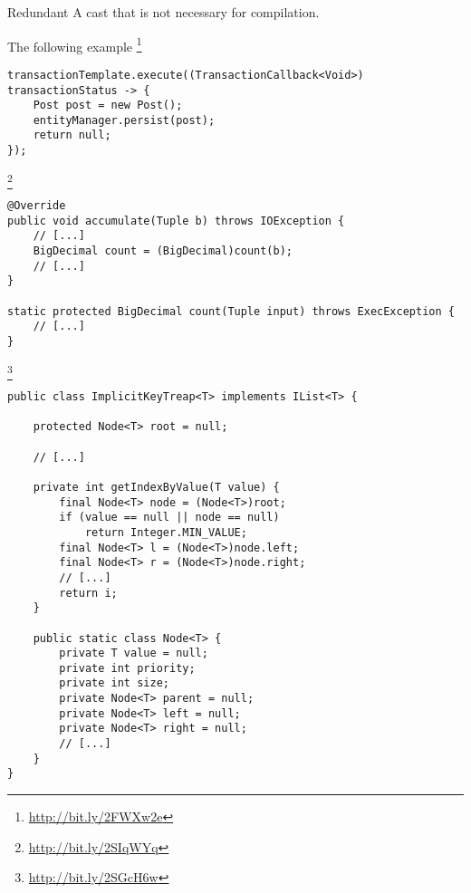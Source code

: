 \begin{pattern}{Redundant}
A cast that is not necessary for compilation.

\instances{}
The following example%
\footnote{\url{http://bit.ly/2FWXw2e}}

\begin{verbatim}
transactionTemplate.execute((TransactionCallback<Void>) transactionStatus -> {
    Post post = new Post();
    entityManager.persist(post);
    return null;
});
\end{verbatim}

\footnote{\url{http://bit.ly/2SIqWYq}}

\begin{verbatim}
@Override
public void accumulate(Tuple b) throws IOException {
    // [...]
    BigDecimal count = (BigDecimal)count(b);
    // [...]
}

static protected BigDecimal count(Tuple input) throws ExecException {
    // [...]
}
\end{verbatim}

\footnote{\url{http://bit.ly/2SGcH6w}}

\begin{verbatim}
public class ImplicitKeyTreap<T> implements IList<T> {

    protected Node<T> root = null;

    // [...]

    private int getIndexByValue(T value) {
        final Node<T> node = (Node<T>)root;
        if (value == null || node == null)
            return Integer.MIN_VALUE;
        final Node<T> l = (Node<T>)node.left;
        final Node<T> r = (Node<T>)node.right;
        // [...]
        return i;
    }

    public static class Node<T> {
        private T value = null;
        private int priority;
        private int size;
        private Node<T> parent = null;
        private Node<T> left = null;
        private Node<T> right = null;
        // [...]
    }
}
\end{verbatim}

\detection{}

\discussion{}

\related{}
    
\end{pattern}
